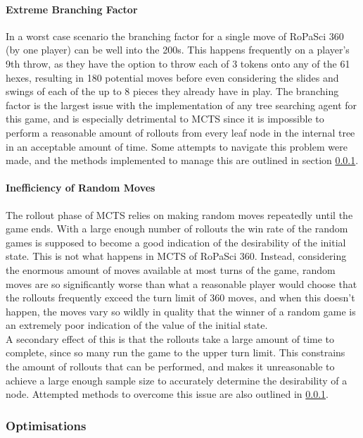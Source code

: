 \documentclass{article}
\begin{document}
\paragraph{Extreme Branching Factor}
In a worst case scenario the branching factor for a single move of RoPaSci 360 (by one player) can be well into the 200s. This happens frequently on a player's 9th throw, as they have the option to throw each of 3 tokens onto any of the 61 hexes, resulting in 180 potential moves before even considering the slides and swings of each of the up to 8 pieces they already have in play. The branching factor is the largest issue with the implementation of any tree searching agent for this game, and is especially detrimental to MCTS since it is impossible to perform a reasonable amount of rollouts from every leaf node in the internal tree in an acceptable amount of time. Some attempts to navigate this problem were made, and the methods implemented to manage this are outlined in section \ref{sec: MCTS Optimisations}.
\paragraph{Inefficiency of Random Moves}
The rollout phase of MCTS relies on making random moves repeatedly until the game ends. With a large enough number of rollouts the win rate of the random games is supposed to become a good indication of the desirability of the initial state. This is not what happens in MCTS of RoPaSci 360. Instead, considering the enormous amount of moves available at most turns of the game, random moves are so significantly worse than what a reasonable player would choose that the rollouts frequently exceed the turn limit of 360 moves, and when this doesn't happen, the moves vary so wildly in quality that the winner of a random game is an extremely poor indication of the value of the initial state.\\[2mm]
A secondary effect of this is that the rollouts take a large amount of time to complete, since so many run the game to the upper turn limit. This constrains the amount of rollouts that can be performed, and makes it unreasonable to achieve a large enough sample size to accurately determine the desirability of a node. Attempted methods to overcome this issue are also outlined in \ref{sec: MCTS Optimisations}.

\subsubsection{Optimisations}
\label{sec: MCTS Optimisations}
\end{document}
